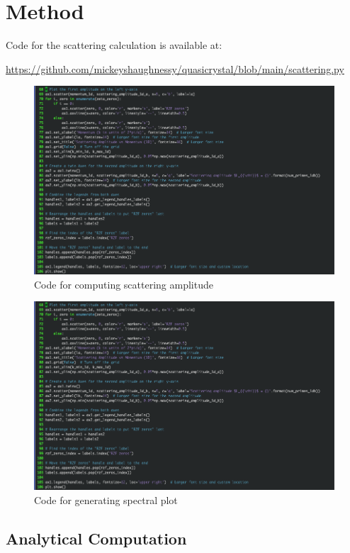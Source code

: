 \documentclass[11pt, oneside]{article}
\begin{document}
\section{Method}

Code for the scattering calculation is available at:
 
\url{https://github.com/mickeyshaughnessy/quasicrystal/blob/main/scattering.py}
 
\begin{figure}[htbp]
\begin{center}
    \includegraphics[width=0.8\linewidth]{../images/scattering_code.png}
\caption{Code for computing scattering amplitude}
\label{fig:scattering_code}
\end{center}
\end{figure}
 
\begin{figure}[htbp]
\begin{center}
    \includegraphics[width=0.8\linewidth]{../images/plotting_code.png}
\caption{Code for generating spectral plot}
\label{fig:plotting_code}
\end{center}
\end{figure}

\subsection{Analytical Computation}
 
\end{document}
